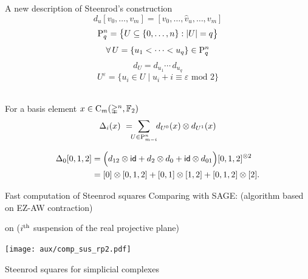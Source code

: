 \begin{frame}[fragile]{A new description of Steenrod's construction}
	\pause
	\[
	d_u[v_0, \dots, v_m] = [v_0, \dots, \widehat v_u, \dots, v_m]
	\]
	\pause\vspace*{-15pt}
	\[
	\rP_q^n = \set[\big]{U \subseteq \{0, \dots, n\} : \bars{U} = q}
	\]
	\pause\vspace*{-15pt}
	\[
	\forall \, U = \{u_1 < \dots < u_q\} \in \rP_q^n
	\]
	\pause\vspace*{-15pt}
	\[
	d_U = d_{u_1} \dotsm \, d_{u_q}
	\]
	\pause\vspace*{-15pt}
	\[
	U^\varepsilon = \big\{ u_i \in U \mid u_i + i \equiv \varepsilon \text{ mod } 2 \big\}
	\]

	\bigskip\pause
	 \\
	For a basis element $x \in \gchains_m(\gsimplex^n, \Ftwo)$
	\vspace*{-5pt}
	\[
	\Delta_i(x) \ = \!\!\! \sum_{U \in \rP_{m-i}^n} \!\! d_{U^0}(x) \otimes d_{U^1}(x)
	\]
	\vspace*{-10pt}

	\pause
	\vspace*{-5pt}
	\begin{align*}
	\Delta_0 [0,1,2] &=
	\Big( d_{12} \otimes \id + d_2 \otimes d_0 + \id \otimes d_{01} \Big) [0,1,2]^{\otimes 2} \\ &=
	[0] \otimes [0,1,2] + [0,1] \otimes [1,2] + [0,1,2] \otimes [2].
	\end{align*}
\end{frame}

\begin{frame}{Fast computation of Steenrod squares}
	\pause
	Comparing with SAGE: (algorithm based on EZ-AW contraction)

	\smallskip\pause
	 on  ($i^\th$ suspension of the real projective plane)

	\medskip
	\texttt{[image: aux/comp\_sus\_rp2.pdf]}
\end{frame}

\begin{frame}{Steenrod squares for simplicial complexes}
	
\end{frame}

